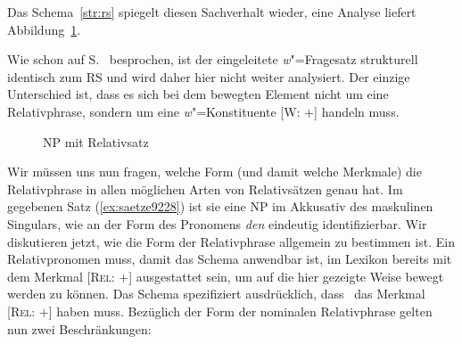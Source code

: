 Das Schema~\ref{str:rs} spiegelt diesen Sachverhalt wieder, eine Analyse liefert Abbildung~\ref{fig:saetze9228}.



Wie schon auf S.~\pageref{abs:923478} besprochen, ist der eingeleitete \textit{w}"=Fragesatz strukturell identisch zum RS und wird daher hier nicht weiter analysiert.
Der einzige Unterschied ist, dass es sich bei dem bewegten Element nicht um eine Relativphrase, sondern um eine \textit{w}"=Konstituente [\textsc{W}: $+$] handeln muss.



\begin{figure}
  \centering
  \vspace{0.3cm}
  \caption{NP mit Relativsatz}
  \label{fig:saetze9228}
\end{figure}


Wir müssen uns nun fragen, welche Form (und damit welche Merkmale) die Relativphrase in allen möglichen Arten von Relativsätzen genau hat.
Im gegebenen Satz (\ref{ex:saetze9228}) ist sie eine NP im Akkusativ des maskulinen Singulars, wie an der Form des Pronomens \textit{den} eindeutig identifizierbar.
Wir diskutieren jetzt, wie die Form der Relativphrase allgemein zu bestimmen ist.
Ein Relativpronomen muss, damit das Schema anwendbar ist, im Lexikon bereits mit dem Merkmal [\textsc{Rel}: $+$] ausgestattet sein, um auf die hier gezeigte Weise bewegt werden zu können.
Das Schema spezifiziert ausdrücklich, dass \Ti\ das Merkmal [\textsc{Rel}: $+$] haben muss.
Bezüglich der Form der nominalen Relativphrase gelten nun zwei Beschränkungen:

